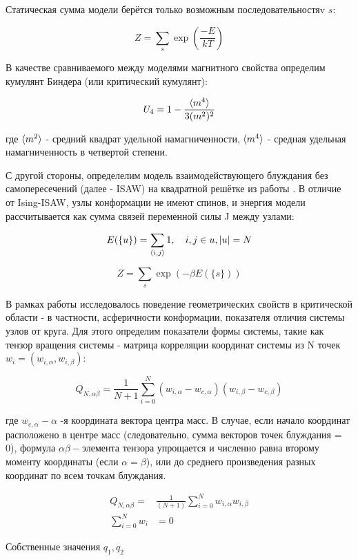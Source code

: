 Статическая сумма модели берётся только возможным последовательностяv ${s}$:

\begin{equation}
Z = \sum_s \exp{(\frac{-E}{kT})}
\end{equation}

В качестве сравниваемого между моделями магнитного свойства определим кумулянт Биндера (или критический кумулянт):

\begin{equation}
\label{eq:Cumulant}
U_{4} = 1 - \frac{\langle m^{4} \rangle}{3 (m^{2})^{2}}
\end{equation}

где $\langle m^{2} \rangle$  - средний квадрат удельной намагниченности, $\langle m^{4} \rangle$ - средная удельная намагниченность в четвертой степени. 

С другой стороны, определелим модель взаимодействующего блуждания без самопересечений (далее - ISAW) на квадратной решётке из работы \cite{caracciolo2011geometrical}.
В отличие от Ising-ISAW, узлы конформации не имеют спинов, и энергия модели рассчитывается как сумма связей переменной силы J между узлами:

\begin{equation}
E(\{u\}) = \sum_{\la i, j \ra} 1,\ \ \ i,j \in u, |u|=N
\end{equation}

\begin{equation}
Z = \sum_s \exp{(- \beta E(\{s\}))}
\end{equation}

В рамках работы \cite{caracciolo2011geometrical} исследовалось поведение геометрических свойств в критической области - в частности, асферичности конформации, показателя отличия системы узлов от круга.
Для этого определим показатели формы системы, такие как тензор вращения системы - матрица корреляции координат системы из N точек $w_i = (w_{i,\alpha}, w_{i,\beta})$:

\begin{equation}\label{eq:Ten_G1}
    Q_{N,\alpha\beta} = \frac{1}{N+1} \sum^{N}_{i=0}(w_{i,\alpha} - w_{c, \alpha})(w_{i,\beta} - w_{c, \beta})
\end{equation}

где $w_{c,\alpha} - \alpha$ -я координата вектора центра масс. В случае, если начало координат расположено в центре масс (следовательно, сумма векторов точек блуждания = 0), формула $\alpha\beta-$элемента тензора упрощается и численно равна второму моменту координаты (если $\alpha = \beta$), или до среднего произведения разных координат по всем точкам блуждания.

\begin{align}\label{eq:Ten_G_C}
    Q_{N,\alpha\beta} = &\frac{1}{(N+1)} \sum_{i=0}^{N} w_{i, \alpha} w_{i, \beta} \\
    \sum^{N}_{i=0}w_{i} &= 0
\end{align}

Собственные значения $q_1, q_2$ 


